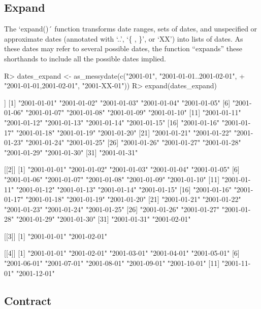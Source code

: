 \documentclass[
]{jss}
\begin{document}
\hypertarget{expand}{%
\subsection{Expand}\label{expand}}

The `expand()´ function transforms date ranges, sets of dates, and
unspecified or approximate dates (annotated with `..', `\{ , \}', or
`XX') into lists of dates. As these dates may refer to several possible
dates, the function ``expands'' these shorthands to include all the
possible dates implied.

\begin{CodeChunk}
\begin{CodeInput}
R> dates_expand <- as_messydate(c("2001-01", "2001-01-01..2001-02-01",
+                                "{2001-01-01,2001-02-01}", "2001-XX-01"))
R> expand(dates_expand)
\end{CodeInput}
\begin{CodeOutput}
[[1]]
 [1] "2001-01-01" "2001-01-02" "2001-01-03" "2001-01-04" "2001-01-05"
 [6] "2001-01-06" "2001-01-07" "2001-01-08" "2001-01-09" "2001-01-10"
[11] "2001-01-11" "2001-01-12" "2001-01-13" "2001-01-14" "2001-01-15"
[16] "2001-01-16" "2001-01-17" "2001-01-18" "2001-01-19" "2001-01-20"
[21] "2001-01-21" "2001-01-22" "2001-01-23" "2001-01-24" "2001-01-25"
[26] "2001-01-26" "2001-01-27" "2001-01-28" "2001-01-29" "2001-01-30"
[31] "2001-01-31"

[[2]]
 [1] "2001-01-01" "2001-01-02" "2001-01-03" "2001-01-04" "2001-01-05"
 [6] "2001-01-06" "2001-01-07" "2001-01-08" "2001-01-09" "2001-01-10"
[11] "2001-01-11" "2001-01-12" "2001-01-13" "2001-01-14" "2001-01-15"
[16] "2001-01-16" "2001-01-17" "2001-01-18" "2001-01-19" "2001-01-20"
[21] "2001-01-21" "2001-01-22" "2001-01-23" "2001-01-24" "2001-01-25"
[26] "2001-01-26" "2001-01-27" "2001-01-28" "2001-01-29" "2001-01-30"
[31] "2001-01-31" "2001-02-01"

[[3]]
[1] "2001-01-01" "2001-02-01"

[[4]]
 [1] "2001-01-01" "2001-02-01" "2001-03-01" "2001-04-01" "2001-05-01"
 [6] "2001-06-01" "2001-07-01" "2001-08-01" "2001-09-01" "2001-10-01"
[11] "2001-11-01" "2001-12-01"
\end{CodeOutput}
\end{CodeChunk}

\hypertarget{contract}{%
\subsection{Contract}\label{contract}}
\end{document}
